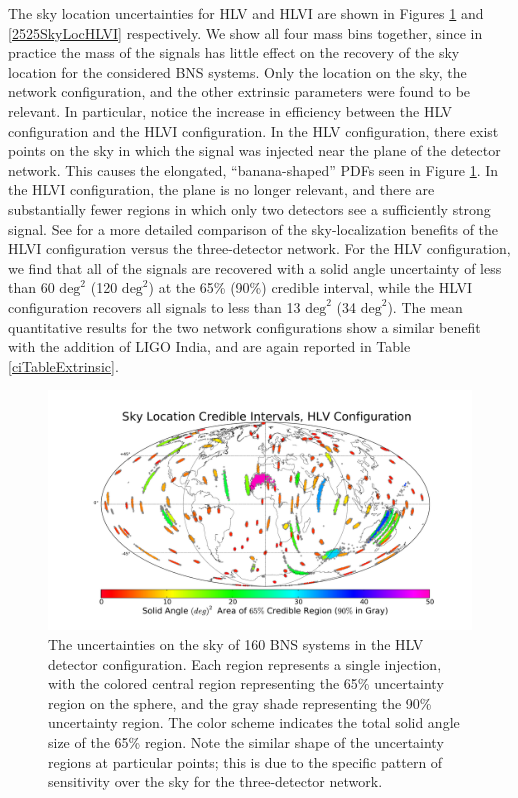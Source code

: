 \documentclass[11pt,a4paper]{emulateapj} 
\begin{document}
The sky location uncertainties for HLV and HLVI are shown in Figures
\ref{2525SkyLocHLV} and \ref{2525SkyLocHLVI} respectively.  We show
all four mass bins together, since in practice the mass of the signals
has little effect on the recovery of the sky location for the
considered BNS systems.  Only the location on the sky, the network
configuration, and the other extrinsic parameters were found to be
relevant.  In particular, notice the increase in efficiency between
the HLV configuration and the HLVI configuration.  In the HLV
configuration, there exist points on the sky in which the signal was
injected near the plane of the detector network.  This causes the
elongated, ``banana-shaped'' PDFs seen in Figure \ref{2525SkyLocHLV}.
In the HLVI configuration, the plane is no longer relevant, and there
are substantially fewer regions in which only two detectors see a
sufficiently strong signal.  See \cite{Veitch2012} for a more detailed
comparison of the sky-localization benefits of the HLVI configuration
versus the three-detector network.  For the HLV configuration, we find that
 all of the signals are recovered with
a solid angle uncertainty of less than 60 $\mathrm{deg}^2$ (120 $\mathrm{deg}^2$)
at the 65\% (90\%) credible interval, while the HLVI configuration 
recovers all signals to less than 13 $\mathrm{deg}^2$ (34 $\mathrm{deg}^2$).
The mean quantitative results for the two network configurations show a similar
 benefit with the addition of LIGO India, and are again reported in
  Table \ref{ciTableExtrinsic}. 



\begin{figure}[ht!]
  \centering \includegraphics[angle=0,scale=0.4, trim=5cm 2cm 3cm
    0cm]{HLVsky.pdf}
 \caption{The uncertainties on the sky of 160 BNS systems in the HLV
   detector configuration.  Each region represents a single injection,
   with the colored central region representing the 65\% uncertainty
   region on the sphere, and the gray shade representing the 90\%
   uncertainty region.  The color scheme indicates the total solid
   angle size of the 65\% region.  Note the similar shape of the
   uncertainty regions at particular points; this is due to the
   specific pattern of sensitivity over the sky for the three-detector network.}
 \label{2525SkyLocHLV}
\end{figure}
\end{document}
